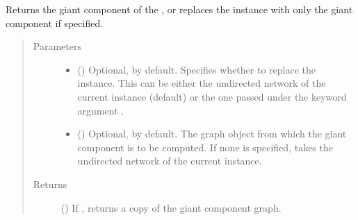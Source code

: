 \documentclass[letterpaper,10pt,english]{sphinxmanual}
\begin{document}
\begin{fulllineitems}
\begin{fulllineitems}
\label{\detokenize{main:pypath.main.PyPath.get_giant}}
Returns the giant component of the , or replaces the
 instance with only the giant component
if specified.
\begin{quote}\begin{description}
\item[{Parameters}] \leavevmode\begin{itemize}
\item {} 
 () \textendash{} Optional,  by default. Specifies whether to replace
the  instance. This can be either
the undirected network of the current
{\hyperref[\detokenize{main:pypath.main.PyPath}]{}} instance (default) or the one
passed under the keyword argument .

\item {} 
 () \textendash{} Optional,  by default. The graph object from which
the giant component is to be computed. If none is specified,
takes the undirected network of the current
{\hyperref[\detokenize{main:pypath.main.PyPath}]{}} instance.

\end{itemize}

\item[{Returns}] \leavevmode
() \textendash{} If , returns a copy of
the giant component graph.

\end{description}\end{quote}

\end{fulllineitems}


\begin{fulllineitems}
\label{\detokenize{main:pypath.main.PyPath.get_max}}
\end{fulllineitems}


\end{fulllineitems}
\end{document}
